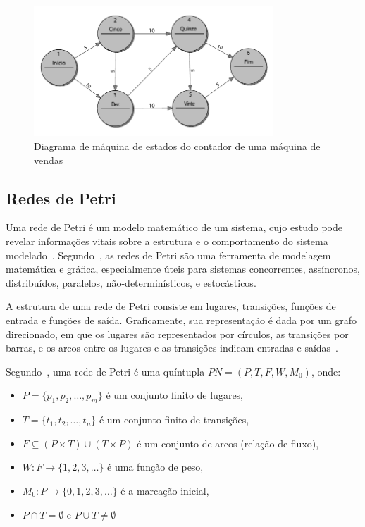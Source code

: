 \begin{figure}[ht]
	\caption{\label{fig:fsm_2}Diagrama de máquina de estados do contador de uma máquina de vendas}
	\begin{center}
	    \includegraphics[width=0.8\textwidth]{resources/fsm_wagner}
	\end{center}
\end{figure}


\subsection{Redes de Petri}\label{sec:petrinet}

Uma rede de Petri é um modelo matemático de um sistema, cujo estudo pode revelar informações vitais sobre a estrutura e o comportamento do sistema modelado~\cite{peterson:1981}. Segundo~, as redes de Petri são uma ferramenta de modelagem matemática e gráfica, especialmente úteis para sistemas concorrentes, assíncronos, distribuídos, paralelos, não-determinísticos, e estocásticos.

A estrutura de uma rede de Petri consiste em lugares, transições, funções de entrada e funções de saída. Graficamente, sua representação é dada por um grafo direcionado, em que os lugares são representados por círculos, as transições por barras, e os arcos entre os lugares e as transições indicam entradas e saídas~\cite{peterson:1981}. %

Segundo~, uma rede de Petri é uma quíntupla \(PN = (P, T, F, W, M_0)\), onde:
\begin{itemize}
    \item \(P = \{p_1, p_2, \ldots , p_m\}\) é um conjunto finito de lugares,
    \item \(T = \{t_1, t_2, \ldots, t_n\}\) é um conjunto finito de transições,
    \item \(F \subseteq (P \times T) \cup (T \times P)\) é um conjunto de arcos (relação de fluxo),
    \item \(W: F \to \{1,2,3,\ldots\}\) é uma função de peso,
    \item \(M_0: P \to \{0,1,2,3,\ldots\}\) é a marcação inicial,
    \item \(P \cap T = \emptyset\) e \(P \cup T \neq \emptyset\)
\end{itemize}

